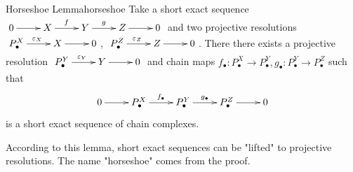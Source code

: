 \documentclass[twoside = false,	%
		headsepline,		%
		parskip = true,
		]{scrbook}						%
\begin{document}
    \begin{lemma}{Horseshoe Lemma}{horseshoe}
        Take a short exact sequence $\xymatrix{0 \ar[r]& X\ar[r]^{f} & Y\ar[r]^g & Z\ar[r] & 0}$ and two projective resolutions $\xymatrix {P_\bullet^X \ar[r]^{\e_X} & X \ar[r] & 0}$, $\xymatrix {P_\bullet^Z \ar[r]^{\e_Z} & Z \ar[r] & 0}$. There there exists a projective resolution $\xymatrix {P_\bullet^Y \ar[r]^{\e_Y} & Y \ar[r] & 0}$ and chain maps $f_\bullet:P_\bullet^X \to P_\bullet^Y, g_\bullet: P_\bullet^Y \to P_\bullet^Z$ such that
        \begin{equation*}
        \xymatrix {
            0 \ar[r]& P_\bullet^X \ar[r]^{f_\bullet} & \ar[r]^{g_\bullet} P_\bullet^Y & P_\bullet^Z \ar[r] & 0 
        }
        \end{equation*} is a short exact sequence of chain complexes.
    \end{lemma}
    According to this lemma, short exact sequences can be "lifted" to projective resolutions. The name "horseshoe" comes from the proof.
    
\end{document}
